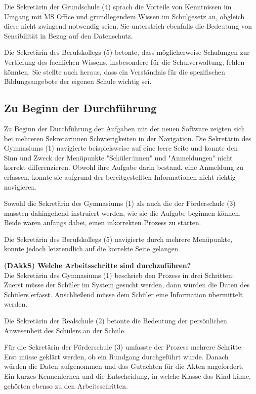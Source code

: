 Die Sekretärin der Grundschule (4) sprach die Vorteile von Kenntnissen im Umgang mit MS Office und grundlegendem Wissen im Schulgesetz an, obgleich diese nicht zwingend notwendig seien. Sie unterstrich ebenfalls die Bedeutung von Sensibilität in Bezug auf den Datenschutz.

Die Sekretärin des Berufskollegs (5) betonte, dass möglicherweise Schulungen zur Vertiefung des fachlichen Wissens, insbesondere für die Schulverwaltung, fehlen könnten. Sie stellte auch heraus, dass ein Verständnis für die spezifischen Bildungsangebote der eigenen Schule wichtig sei.


\subsection{Zu Beginn der Durchführung}
Zu Beginn der Durchführung der Aufgaben mit der neuen Software zeigten sich bei mehreren Sekretärinnen Schwierigkeiten in der Navigation. Die Sekretärin des Gymnasiums (1) navigierte beispielsweise auf eine leere Seite und konnte den Sinn und Zweck der Menüpunkte "Schüler:innen" und "Anmeldungen" nicht korrekt differenzieren. Obwohl ihre Aufgabe darin bestand, eine Anmeldung zu erfassen, konnte sie aufgrund der bereitgestellten Informationen nicht richtig navigieren.

Sowohl die Sekretärin des Gymnasiums (1) als auch die der Förderschule (3) mussten dahingehend instruiert werden, wie sie die Aufgabe beginnen können. Beide waren anfangs dabei, einen inkorrekten Prozess zu starten.

Die Sekretärin des Berufskollegs (5) navigierte durch mehrere Menüpunkte, konnte jedoch letztendlich auf die korrekte Seite gelangen. 

\textbf{(DAkkS) Welche Arbeitsschritte sind durchzuführen?}\\
Die Sekretärin des Gymnasiums (1) beschrieb den Prozess in drei Schritten: Zuerst müsse der Schüler im System gesucht werden, dann würden die Daten des Schülers erfasst. Anschließend müsse dem Schüler eine Information übermittelt werden.

Die Sekretärin der Realschule (2) betonte die Bedeutung der persönlichen Anwesenheit des Schülers an der Schule.

Für die Sekretärin der Förderschule (3) umfasste der Prozess mehrere Schritte: Erst müsse geklärt werden, ob ein Rundgang durchgeführt wurde. Danach würden die Daten aufgenommen und das Gutachten für die Akten angefordert. Ein kurzes Kennenlernen und die Entscheidung, in welche Klasse das Kind käme, gehörten ebenso zu den Arbeitsschritten.

